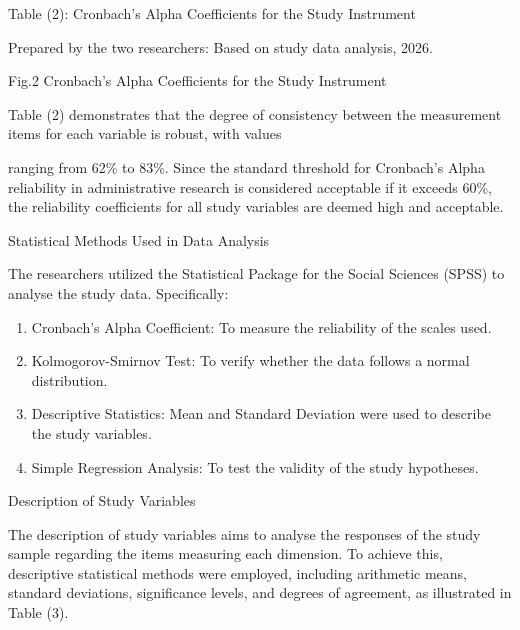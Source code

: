 \documentclass[10pt]{NSP1}
\begin{document}
Table (2): Cronbach’s Alpha Coefficients for the Study Instrument

\begin{table}[htbp]
\centering
{}
\caption{}

\end{table}

Prepared by the two researchers: Based on study data analysis, 2026.

Fig.2 Cronbach’s Alpha Coefficients for the Study Instrument

Table (2) demonstrates that the degree of consistency between the measurement items for each variable is robust, with values

ranging from 62\% to 83\%. Since the standard threshold for Cronbach’s Alpha reliability in administrative research is considered acceptable if it exceeds 60\%, the reliability coefficients for all study variables are deemed high and acceptable.

Statistical Methods Used in Data Analysis

The researchers utilized the Statistical Package for the Social Sciences (SPSS) to analyse the study data. Specifically:

\begin{enumerate}
  \item Cronbach’s Alpha Coefficient: To measure the reliability of the scales used.
  \item Kolmogorov-Smirnov Test: To verify whether the data follows a normal distribution.
  \item Descriptive Statistics: Mean and Standard Deviation were used to describe the study variables.
  \item Simple Regression Analysis: To test the validity of the study hypotheses.
\end{enumerate}

Description of Study Variables

The description of study variables aims to analyse the responses of the study sample regarding the items measuring each dimension. To achieve this, descriptive statistical methods were employed, including arithmetic means, standard deviations, significance levels, and degrees of agreement, as illustrated in Table (3).
\end{document}
